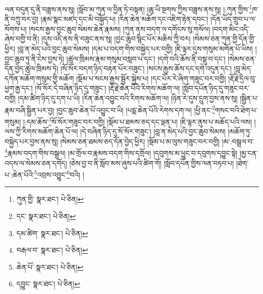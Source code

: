 ལན་བདུན་དུ་ནི་བཟླས་ནས་སུ། །སློབ་མ་ཀུན་ལ་བྱིན་ཏེ་བསྟན། །ཆུ་ཡི་སྔགས་ཀྱིས་བཟླས་ནས་སུ། །:ཀུན་གྱིས་\footnote{ཀུན་གྱི་  སྣར་ཐང་།  པེ་ཅིན། }ཁ་ནི་བཀྲུ་བར་བྱ། །རྣམ་སྣང་མཛད་དང་མི་བསྐྱོད་པ། །རིན་ཆེན་མཆོག་དང་འཇིག་རྟེན་དབང་། །དོན་ཡོད་གྲུབ་པ་ལ་སོགས་པ། །སངས་རྒྱས་བྱང་ཆུབ་སེམས་ཆེན་རྣམས། །ཀུན་ནས་བདག་ལ་དགོངས་སུ་གསོལ། །བདག་མིང་འདི་ཞེས་བགྱི་བ་ནི། །དུས་འདི་ནས་ནི་བཟུང་ནས་སུ། །བྱང་ཆུབ་སྙིང་པོར་མཆིས་ཀྱི་བར། །སེམས་ཅན་ཀུན་གྱི་དོན་གྱི་ཕྱིར། །བླ་ན་མེད་པའི་བྱང་ཆུབ་སེམས། །དམ་པ་བདག་གིས་བསྐྱེད་པར་བགྱི། །ཇི་ལྟར་དུས་གསུམ་མགོན་པོ་ཡིས། །བྱང་ཆུབ་ཏུ་ནི་ངེས་བྱས་ཏེ། །ཚུལ་ཁྲིམས་རྣམ་གསུམ་བསླབ་པ་དང་། །དགེ་བའི་ཆོས་ནི་བསྡུ་བ་དང་། །སེམས་ཅན་དོན་བྱེད་ཚུལ་ཁྲིམས་ཏེ། །སོ་སོར་བདག་ཉིད་བརྟན་པོར་བཟུང་། །སངས་རྒྱས་ཆོས་དང་དགེ་འདུན་དང་། །བླ་མེད་དཀོན་མཆོག་གསུམ་གྱི་མཆོག །སྡོམ་པ་སངས་རྒྱས་སྦྱོར་སྐྱེས་པ། །དང་པོར་རེ་ཞིག་གཟུང་བར་བགྱི། །རྡོ་རྗེ་དྲིལ་བུ་ཕྱག་རྒྱ་དང་། །སོ་སོར་དེ་བཞིན་ཉིད་དུ་གཟུང་། །རྡོ་རྗེ་ཆེན་པོའི་རིགས་མཆོག་ལ། །སློབ་དཔོན་ཉིད་དུ་གཟུང་བར་བགྱི། །དམ་ཚིག་ཉིད་དུ་དག་པ་ཡི། །རིན་ཆེན་འབྱུང་བའི་རིགས་མཆོག་ལ། །ཉིན་རེ་དུས་དྲུག་བྱས་ནས་སུ། །སྦྱིན་པ་རྣམ་བཞི་སྦྱིན་པར་བྱ། །བྱང་ཆུབ་ཆེན་པོ་འབྱུང་བ་ཡི། །པདྨ་ཆེན་པོའི་རེགས་དག་ལ། །ཕྱི་ནང་\footnote{དང་  སྣར་ཐང་།  པེ་ཅིན། }གསང་བའི་ཐེག་པ་གསུམ། །:དམ་ཆོས་\footnote{དམ་ཚིག་  སྣར་ཐང་།  པེ་ཅིན། }སོ་སོར་གཟུང་བར་བགྱི། །སྡོམ་པ་ཐམས་ཅད་དང་ལྡན་པ། །ཇི་ལྟར་ནུས་པ་མཆོད་པའི་ལས། །ལས་ཀྱི་རིགས་མཆོག་ཆེན་པོ་ལ། །དེ་བཞིན་ཉིད་དུ་སོ་སོར་གཟུང་། །བླ་ན་མེད་པའི་བྱང་ཆུབ་སེམས། །མཆོག་ཏུ་བསྐྱེད་པར་བྱས་ནས་སུ། །སེམས་ཅན་ཐམས་ཅད་དོན་བྱེད་ཕྱིར། །སྡོམ་པ་མ་ལུས་གཟུང་བར་བགྱི། །མ་:བསྒྲལ་བ་\footnote{བརྒལ་བ་  སྣར་ཐང་།  པེ་ཅིན། }རྣམས་བདག་གིས་བསྒྲལ། །མ་གྲོལ་བ་རྣམས་བདག་གིས་དགྲོལ། །དབུགས་མ་ཕྱུང་བ་དབུགས་དབྱུང་སྟེ། །མྱ་ངན་འདས་ལ་སེམས་ཅན་དགོད། །ཅེས་བྱ་བ་ནི་སློབ་མས་ཞུས་པའི་ཚིག་གོ། །སློབ་དཔོན་གྱིས་ལན་བཏབ་པ། །ཐེག་པ་:ཆེན་པོའི་\footnote{ཆེན་པོ་  སྣར་ཐང་།  པེ་ཅིན། }འབྲས་འབྱུང་\footnote{དབྱུང་  སྣར་ཐང་།  པེ་ཅིན། }བའི། །
